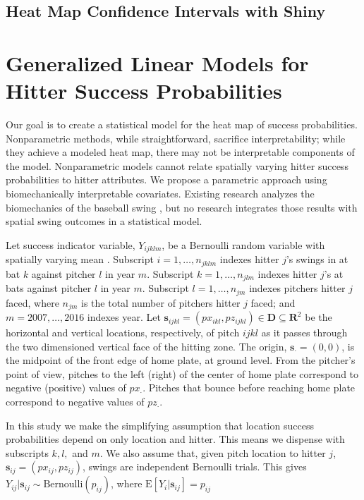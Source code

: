 \documentclass{article}
\begin{document}
\subsection{Heat Map Confidence Intervals with Shiny}

\section{Generalized Linear Models for Hitter Success Probabilities} 

Our goal is to create a statistical model for the heat map of success probabilities. Nonparametric methods, while straightforward, sacrifice interpretability; while they achieve a modeled heat map, there may not be interpretable components of the model. Nonparametric models cannot relate spatially varying hitter success probabilities to hitter attributes. We propose a parametric approach using biomechanically interpretable covariates. Existing research analyzes the biomechanics of the baseball swing \citep{Welch1995}, but no research integrates those results with spatial swing outcomes in a statistical model.


Let success indicator variable, $Y_{ijklm}$, be a Bernoulli random variable with spatially varying mean \citep{Ross2002}. Subscript $i = 1, \dots, n_{jklm}$ indexes hitter $j$'s swings in at bat $k$ against pitcher $l$ in year $m$. Subscript $k = 1, \dots, n_{jlm}$ indexes hitter $j$'s at bats against pitcher $l$ in year $m$. Subscript $l = 1, \dots, n_{jm}$ indexes pitchers hitter $j$ faced, where $n_{jm}$ is the total number of pitchers hitter $j$ faced; and $m = 2007, \dots, 2016$ indexes year. Let $\pmb{s}_{ijkl} = (px_{ikl}, pz_{ijkl})\in \pmb{D} \subseteq \pmb{R}^{2}$ be the horizontal and vertical locations, respectively, of pitch $ijkl$ as it passes through the two dimensioned vertical face of the hitting zone. The origin, $\pmb{s}_{\cdot} = (0,0)$, is the midpoint of the front edge of home plate, at ground level. From the pitcher's point of view, pitches to the left (right) of the center of home plate correspond to negative (positive) values of $px_{\cdot}$. Pitches that bounce before reaching home plate correspond to negative values of $pz_{\cdot}$.  

In this study we make the simplifying assumption that location success probabilities depend on only location and hitter. This means we dispense with subscripts $k, l,$ and $m$. We also assume that, given pitch location to hitter $j$, $\pmb{s}_{ij} = (px_{ij}, pz_{ij})$,  swings are independent Bernoulli trials. This gives $Y_{ij}|\pmb{s}_{ij} \sim \text{Bernoulli}(p_{ij})$, where $\text{E}[Y_{i}|\pmb{s}_{ij}] = p_{ij}$
\end{document}

